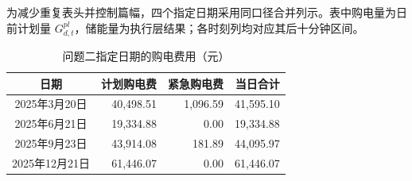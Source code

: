 \documentclass[withoutpreface,bwprint]{cumcmthesis}
\begin{document}
为减少重复表头并控制篇幅，四个指定日期采用同口径合并列示。表中购电量为日前计划量
\(G_{d,t}^{pl}\)，储能量为执行层结果；各时刻列均对应其后十分钟区间。

\begin{table}[!htbp]
\centering\scriptsize
\caption{问题二指定日期的计划购电量（kWh）}
\setlength{\tabcolsep}{3pt}
\end{table}

\begin{table}[!htbp]
\centering\small
\caption{问题二指定日期的购电费用（元）}
\setlength{\tabcolsep}{6pt}
\begin{tabular}{|c|r|r|r|}
\hline
日期 & 计划购电费 & 紧急购电费 & 当日合计 \\
\hline
2025年3月20日 & 40,498.51 & 1,096.59 & 41,595.10 \\
\hline
2025年6月21日 & 19,334.88 & 0.00 & 19,334.88 \\
\hline
2025年9月23日 & 43,914.08 & 181.89 & 44,095.97 \\
\hline
2025年12月21日 & 61,446.07 & 0.00 & 61,446.07 \\
\hline
\end{tabular}
\end{table}
\end{document}
